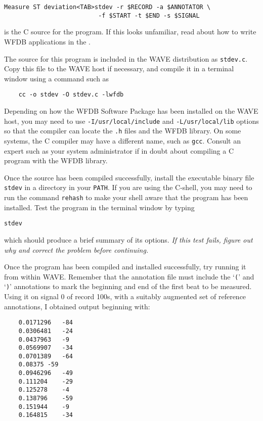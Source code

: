 \documentclass[twoside]{book}
\newcommand{\WAVE}{{\sf WAVE}\xspace}
\begin{document}
\begin{verbatim}
Measure ST deviation<TAB>stdev -r $RECORD -a $ANNOTATOR \
                          -f $START -t $END -s $SIGNAL
\end{verbatim}
is the C source for the program.  If this looks unfamiliar, read
about how to write WFDB applications in the
.

\begin{latexonly}
{\small

}
\end{latexonly}

The source for this program is included in the \WAVE{} distribution as
{\tt stdev.c}.  Copy this file to the \WAVE{} host if necessary, and
compile it in a terminal window using a command such as
\begin{verbatim}
    cc -o stdev -O stdev.c -lwfdb
\end{verbatim}
Depending on how the WFDB Software Package has been installed on the
\WAVE{} host, you may need to use {\tt -I/usr/local/include} and
{\tt -L/usr/local/lib} options so that the compiler can
locate the {\tt *.h} files and the WFDB library.  On some systems, the
C compiler may have a different name, such as {\tt gcc}.  Consult an
expert such as your system administrator if in doubt about compiling
a C program with the WFDB library.

Once the source has been compiled successfully, install the executable
binary file {\tt stdev} in a directory in your {\tt PATH}.  If you
are using the C-shell, you may need to run the command {\tt rehash} to
make your shell aware that the program has been installed.  Test the
program in the terminal window by typing

{\tt stdev}

\noindent
which should produce a brief summary of its options.   \emph{If this
test fails, figure out why and correct the problem before continuing.}

Once the program has been compiled and installed successfully, try
running it from within \WAVE{}.  Remember that the annotation file must
include the `{\tt (}' and `{\tt )}' annotations to mark the beginning
and end of the first beat to be measured.  Using it on signal 0 of
record 100s, with a suitably augmented set of reference annotations, I
obtained output beginning with:
\begin{verbatim}
    0.0171296	-84
    0.0306481	-24
    0.0437963	-9
    0.0569907	-34
    0.0701389	-64
    0.08375	-59
    0.0946296	-49
    0.111204	-29
    0.125278	-4
    0.138796	-59
    0.151944	-9
    0.164815	-34
\end{verbatim}
\end{document}
